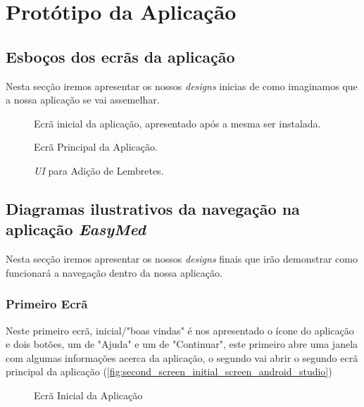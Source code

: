 \documentclass[a4paper]{article}
\begin{document}
\section{Protótipo da Aplicação}\label{section:app_prototype}

\subsection{Esboços dos ecrãs da aplicação}

Nesta secção iremos apresentar os nossos \textit{designs} inicias de como imaginamos que a nossa aplicação se vai assemelhar.

\begin{figure}[H]
    \centering
    \caption{Ecrã inicial da aplicação, apresentado após a mesma ser instalada.}
    \label{fig:first_screen_inicial_screen}
\end{figure}

\newpage

\begin{figure}[H]
    \centering
    \caption{Ecrã Principal da Aplicação.}
    \label{fig:second_screen_main_screen}
\end{figure}

\newpage

\begin{figure}[H]
    \centering
    \caption{\textit{UI} para Adição de Lembretes.}
    \label{fig:third_screen_add_remainder}
\end{figure}

\newpage

\subsection{Diagramas ilustrativos da navegação na aplicação \textit{EasyMed}}
Nesta secção iremos apresentar os nossos \textit{designs} finais que irão demonstrar como funcionará a navegação dentro da nossa aplicação.

\subsubsection{Primeiro Ecrã}
Neste primeiro ecrã, inicial/"boas vindas" é nos apresentado o ícone do aplicação e dois botões, um de "Ajuda" e um de "Continuar", este primeiro abre uma janela com algumas informações acerca da aplicação, o segundo vai abrir o segundo ecrã principal da aplicação (\ref{fig:second_screen_initial_screen_android_studio})
\begin{figure}[H]
    \centering
    \caption{Ecrã Inicial da Aplicação}
    \label{fig:fisrt_screen_initial_screen_android_studio}
\end{figure}
\end{document}
